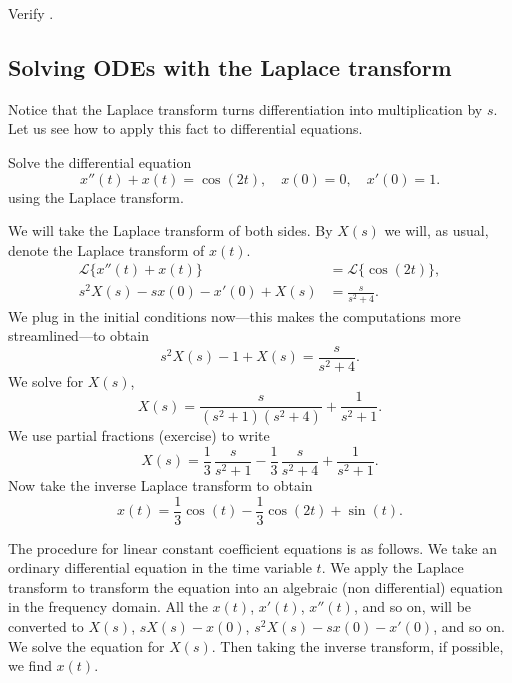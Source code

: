 \begin{exercise}
Verify .
\end{exercise}

\subsection{Solving ODEs with the Laplace transform}

Notice that the Laplace transform turns differentiation into
multiplication by $s$.  Let us see how to apply this fact to differential
equations.

\begin{example}
Solve the differential equation
\begin{equation*}
x''(t) + x(t) = \cos (2t), \quad x(0) = 0, \quad x'(0) = 1 .
\end{equation*}
using the Laplace transform.
\end{example}

\begin{exampleSol}
We will take the Laplace transform of both sides.
By $X(s)$ we will, as usual, denote the Laplace transform of
$x(t)$.
\begin{align*}
\mathcal{L} \bigl\{ x''(t) + x(t) \bigr\} & = \mathcal{L} \bigl\{ \cos (2t) \bigr\} , \\
s^2 X(s) -sx(0)-x'(0) + X(s) & = \frac{s}{s^2 + 4} .
\end{align*}
We plug in the initial conditions now---this makes the computations more
streamlined---to obtain
\begin{equation*}
s^2 X(s) -1 + X(s) = \frac{s}{s^2 + 4} .
\end{equation*}
We solve for $X(s)$,
\begin{equation*}
X(s) = \frac{s}{(s^2+1)(s^2 + 4)} + \frac{1}{s^2+1} .
\end{equation*}
We use partial fractions (exercise) to write
\begin{equation*}
X(s) =\frac{1}{3} \, \frac{s}{s^2+1} - 
\frac{1}{3}\, \frac{s}{s^2+4} + \frac{1}{s^2+1} .
\end{equation*}
Now take the inverse Laplace transform to obtain
\begin{equation*}
x(t) =\frac{1}{3}  \cos (t) -
\frac{1}{3} \cos (2t) + \sin (t) .
\end{equation*}
\end{exampleSol}

The procedure for linear constant coefficient equations is as follows.
We take an ordinary differential
equation in the time variable $t$.  We apply the Laplace transform
to transform the equation into an algebraic (non differential) equation in
the frequency domain.  All the $x(t)$, $x'(t)$, $x''(t)$, and so on, will
be converted to $X(s)$, $sX(s) - x(0)$, $s^2X(s) - sx(0) - x'(0)$,
and so on.
We solve the equation for $X(s)$.
Then taking the inverse transform, if possible, we find $x(t)$.

